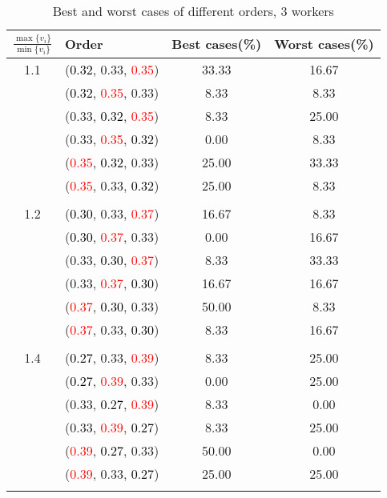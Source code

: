 \documentclass[10pt,a4paper]{report}
\begin{document}
\newpage\begin{center}
	\small
	\begin{longtable}{clcc}
		\caption{Best and worst cases of different orders, 3 workers}\\
		\toprule
		\setlength{\tabcolsep}{1mm}
		\renewcommand\baselinestretch{0.5}\selectfont
		$\frac{\max\{v_i\}}{\min\{v_i\}}$ & Order & Best cases(\%) & Worst cases(\%) \\
			\midrule		1.1			&(\textcolor{black}{0.32}, 0.33, \textcolor{red}{0.35})&33.33&16.67\\
			&(\textcolor{black}{0.32}, \textcolor{red}{0.35}, 0.33)&8.33&8.33\\
			&(0.33, \textcolor{black}{0.32}, \textcolor{red}{0.35})&8.33&25.00\\
			&(0.33, \textcolor{red}{0.35}, \textcolor{black}{0.32})&0.00&8.33\\
			&(\textcolor{red}{0.35}, \textcolor{black}{0.32}, 0.33)&25.00&33.33\\
			&(\textcolor{red}{0.35}, 0.33, \textcolor{black}{0.32})&25.00&8.33\\
		&&&\\
		1.2			&(\textcolor{black}{0.30}, 0.33, \textcolor{red}{0.37})&16.67&8.33\\
			&(\textcolor{black}{0.30}, \textcolor{red}{0.37}, 0.33)&0.00&16.67\\
			&(0.33, \textcolor{black}{0.30}, \textcolor{red}{0.37})&8.33&33.33\\
			&(0.33, \textcolor{red}{0.37}, \textcolor{black}{0.30})&16.67&16.67\\
			&(\textcolor{red}{0.37}, \textcolor{black}{0.30}, 0.33)&50.00&8.33\\
			&(\textcolor{red}{0.37}, 0.33, \textcolor{black}{0.30})&8.33&16.67\\
		&&&\\
		1.4			&(\textcolor{black}{0.27}, 0.33, \textcolor{red}{0.39})&8.33&25.00\\
			&(\textcolor{black}{0.27}, \textcolor{red}{0.39}, 0.33)&0.00&25.00\\
			&(0.33, \textcolor{black}{0.27}, \textcolor{red}{0.39})&8.33&0.00\\
			&(0.33, \textcolor{red}{0.39}, \textcolor{black}{0.27})&8.33&25.00\\
			&(\textcolor{red}{0.39}, \textcolor{black}{0.27}, 0.33)&50.00&0.00\\
			&(\textcolor{red}{0.39}, 0.33, \textcolor{black}{0.27})&25.00&25.00\\
		&&&\\

\end{longtable}
\end{center}
\end{document}
